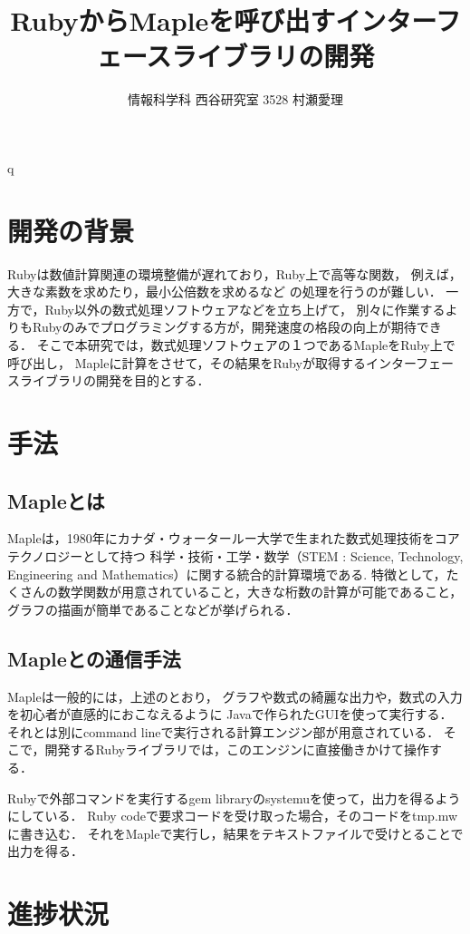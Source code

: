 q\documentclass[10pt,a4j,twocolumn]{jsarticle}
\begin{document}
\title{RubyからMapleを呼び出すインターフェースライブラリの開発}
\author{情報科学科 西谷研究室 3528 村瀬愛理}
\date{}
\maketitle
\section{開発の背景}
Rubyは数値計算関連の環境整備が遅れており，Ruby上で高等な関数，
例えば，大きな素数を求めたり，最小公倍数を求めるなど
の処理を行うのが難しい．
一方で，Ruby以外の数式処理ソフトウェアなどを立ち上げて，
別々に作業するよりもRubyのみでプログラミングする方が，開発速度の格段の向上が期待できる．
そこで本研究では，数式処理ソフトウェアの１つであるMapleをRuby上で呼び出し，
Mapleに計算をさせて，その結果をRubyが取得するインターフェースライブラリの開発を目的とする．

\section{手法}
\subsection{Mapleとは}
Mapleは，1980年にカナダ・ウォータールー大学で生まれた数式処理技術をコアテクノロジーとして持つ
科学・技術・工学・数学（STEM : Science, Technology, Engineering and Mathematics）に関する統合的計算環境である\cite{Maple}.
特徴として，たくさんの数学関数が用意されていること，大きな桁数の計算が可能であること，グラフの描画が簡単であることなどが挙げられる．

\subsection{Mapleとの通信手法}
Mapleは一般的には，上述のとおり，
グラフや数式の綺麗な出力や，数式の入力を初心者が直感的におこなえるように
Javaで作られたGUIを使って実行する．
それとは別にcommand lineで実行される計算エンジン部が用意されている．
そこで，開発するRubyライブラリでは，このエンジンに直接働きかけて操作する．

Rubyで外部コマンドを実行するgem libraryのsystemuを使って，出力を得るようにしている．
Ruby codeで要求コードを受け取った場合，そのコードをtmp.mwに書き込む．
それをMapleで実行し，結果をテキストファイルで受けとることで出力を得る．

\section{進捗状況}
\end{document}
